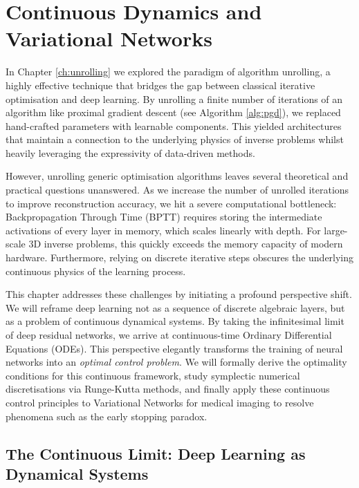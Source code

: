 \chapter{Continuous Dynamics and Variational Networks}
\label{ch:continuous_dynamics}

In Chapter \ref{ch:unrolling} we explored the paradigm of algorithm unrolling, a highly effective technique that bridges the gap between classical iterative optimisation and deep learning. By unrolling a finite number of iterations of an algorithm like proximal gradient descent (see Algorithm \ref{alg:pgd}), we replaced hand-crafted parameters with learnable components. This yielded architectures that maintain a connection to the underlying physics of inverse problems whilst heavily leveraging the expressivity of data-driven methods.

However, unrolling generic optimisation algorithms leaves several theoretical and practical questions unanswered. As we increase the number of unrolled iterations to improve reconstruction accuracy, we hit a severe computational bottleneck: Backpropagation Through Time (BPTT) requires storing the intermediate activations of every layer in memory, which scales linearly with depth. For large-scale 3D inverse problems, this quickly exceeds the memory capacity of modern hardware. Furthermore, relying on discrete iterative steps obscures the underlying continuous physics of the learning process.

This chapter addresses these challenges by initiating a profound perspective shift. We will reframe deep learning not as a sequence of discrete algebraic layers, but as a problem of continuous dynamical systems. By taking the infinitesimal limit of deep residual networks, we arrive at continuous-time Ordinary Differential Equations (ODEs). This perspective elegantly transforms the training of neural networks into an \emph{optimal control problem}. We will formally derive the optimality conditions for this continuous framework, study symplectic numerical discretisations via Runge-Kutta methods, and finally apply these continuous control principles to Variational Networks for medical imaging to resolve phenomena such as the early stopping paradox.

\section{The Continuous Limit: Deep Learning as Dynamical Systems}
\label{sec:continuous_limit}

